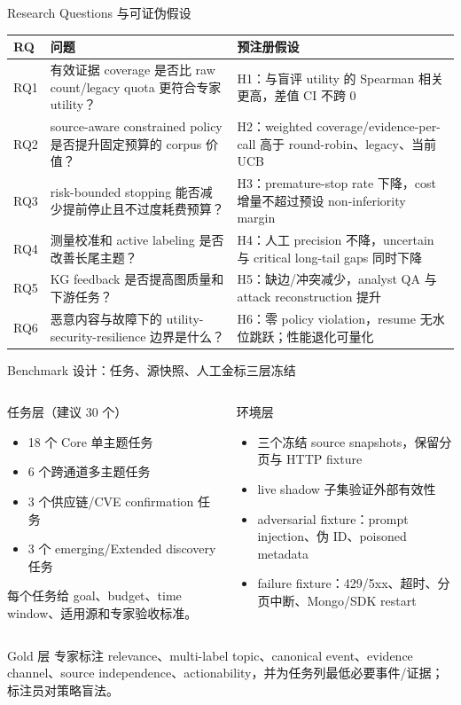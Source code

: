 \begin{frame}{Research Questions 与可证伪假设}
\scriptsize
\begin{tabularx}{\textwidth}{p{} X X}
\toprule
RQ & 问题 & 预注册假设 \\
\midrule
RQ1 & 有效证据 coverage 是否比 raw count/legacy quota 更符合专家 utility？ & H1：与盲评 utility 的 Spearman 相关更高，差值 CI 不跨 0 \\
RQ2 & source-aware constrained policy 是否提升固定预算的 corpus 价值？ & H2：weighted coverage/evidence-per-call 高于 round-robin、legacy、当前 UCB \\
RQ3 & risk-bounded stopping 能否减少提前停止且不过度耗费预算？ & H3：premature-stop rate 下降，cost 增量不超过预设 non-inferiority margin \\
RQ4 & 测量校准和 active labeling 是否改善长尾主题？ & H4：人工 precision 不降，uncertain 与 critical long-tail gaps 同时下降 \\
RQ5 & KG feedback 是否提高图质量和下游任务？ & H5：缺边/冲突减少，analyst QA 与 attack reconstruction 提升 \\
RQ6 & 恶意内容与故障下的 utility-security-resilience 边界是什么？ & H6：零 policy violation，resume 无水位跳跃；性能退化可量化 \\
\bottomrule
\end{tabularx}
\end{frame}

\begin{frame}{Benchmark 设计：任务、源快照、人工金标三层冻结}
\begin{columns}[T,onlytextwidth]
\begin{block}{任务层（建议 30 个）}
\begin{itemize}
  \item 18 个 Core 单主题任务
  \item 6 个跨通道多主题任务
  \item 3 个供应链/CVE confirmation 任务
  \item 3 个 emerging/Extended discovery 任务
\end{itemize}
每个任务给 goal、budget、time window、适用源和专家验收标准。
\end{block}
\begin{block}{环境层}
\begin{itemize}
  \item 三个冻结 source snapshots，保留分页与 HTTP fixture
  \item live shadow 子集验证外部有效性
  \item adversarial fixture：prompt injection、伪 ID、poisoned metadata
  \item failure fixture：429/5xx、超时、分页中断、Mongo/SDK restart
\end{itemize}
\end{block}
\end{columns}

\begin{block}{Gold 层}
专家标注 relevance、multi-label topic、canonical event、evidence channel、source independence、actionability，并为任务列最低必要事件/证据；标注员对策略盲法。
\end{block}
\end{frame}

